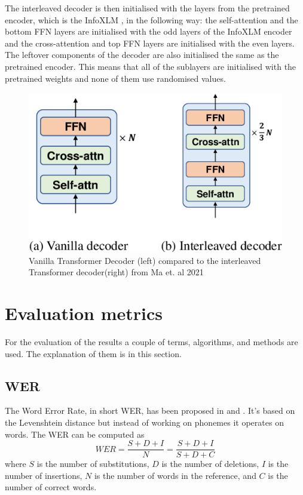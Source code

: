 The interleaved decoder is then initialised with the layers from the pretrained encoder, which is the InfoXLM \cite{chi2021infoxlminformationtheoreticframeworkcrosslingual}, in the following way: the self-attention and the bottom FFN layers are initialised with the odd layers of the InfoXLM encoder and the cross-attention and top FFN layers are initialised with the even layers. 
The leftover components of the decoder are also initialised the same as the pretrained encoder. 
This means that all of the sublayers are initialised with the pretrained weights and none of them use randomised values. 

\begin{figure}
    \centering%
    \includegraphics[width=0.5\linewidth]{Latex/sections/images/interleaveddecoder.png}
    \caption{Vanilla Transformer Decoder (left) compared to the interleaved Transformer decoder(right) from Ma et. al 2021}
    \label{fig:interleaved decoder}
\end{figure}



\section{Evaluation metrics}
 For the evaluation of the results a couple of terms, algorithms, and methods are used. The explanation of them is in this section. 
 
\subsection{WER}
\label{wer}
The Word Error Rate, in short WER, has been proposed in \cite{woodard1982} and \cite{morris2004}.
It's based on the Levenshtein distance \cite{Levenshtein1965BinaryCC} but instead of working on phonemes it operates on words.
The WER can be computed as $$WER=\frac{S+D+I}{N}=\frac{S+D+I}{S+D+C}$$ where $S$ is the number of substitutions, $D$ is the number of deletions, $I$ is the number of insertions, $N$ is the number of words in the reference, and $C$ is the number of correct words.

